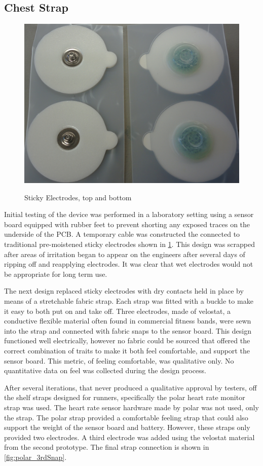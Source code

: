 \subsection {Chest Strap}
\begin{figure}[ht]
\begin{center}
	\label{fig:Electrodes}
	\includegraphics[angle=0,scale=1,width=.5\textwidth]{Images/Electrodes.png} 
	\caption{Sticky Electrodes, top and bottom}
\end{center}
\end{figure}
Initial testing of the device was performed in a laboratory setting using a sensor board equipped with rubber feet to prevent shorting any exposed traces on the underside of the PCB. A temporary cable was constructed the connected to traditional pre-moistened sticky electrodes shown in \cref{fig:Electrodes}. This design was scrapped after areas of irritation began to appear on the engineers after several days of ripping off and reapplying electrodes. It was clear that wet electrodes would not be appropriate for long term use.

The next design replaced sticky electrodes with dry contacts held in place by means of a stretchable fabric strap. Each strap was fitted with a buckle to make it easy to both put on and take off. Three electrodes, made of velostat, a conductive flexible material often found in commercial fitness bands, were sewn into the strap and connected with fabric snaps to the sensor board. This design functioned well electrically, however no fabric could be sourced that offered the correct combination of traits to make it both feel comfortable, and support the sensor board. This metric, of feeling comfortable, was qualitative only. No quantitative data on feel was collected during the design process.

After several iterations, that never produced a qualitative approval by testers, off the shelf straps designed for runners, specifically the polar heart rate monitor strap was used. The heart rate sensor hardware made by polar was not used, only the strap. The polar strap provided a comfortable feeling strap that could also support the weight of the sensor board and battery. However, these straps only provided two electrodes. A third electrode was added using the velostat material from the second prototype. The final strap connection is shown in \cref{fig:polar_3rdSnap}.

